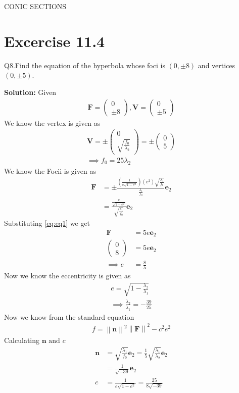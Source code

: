 \documentclass[12pt]{article}
\providecommand{\brak}[1]{\ensuremath{\left(#1\right)}}
\providecommand{\norm}[1]{\left\lVert#1\right\rVert}
\newcommand{\solution}{\noindent \textbf{Solution: }}
\newcommand{\myvec}[1]{\ensuremath{\begin{pmatrix}#1\end{pmatrix}}}
\let\vec\mathbf
\begin{document}
\begin{center}
\textbf\large{CONIC SECTIONS}

\end{center}
\section*{Excercise 11.4}
Q8.Find the equation of the hyperbola whose foci is $\brak{0,\pm 8}$ and vertices $\brak{0,\pm 5}$.

\solution
Given
\begin{align}
	\vec{F} = \myvec{0\\\pm 8}, \vec{V} = \myvec{0\\\pm 5} 
\end{align}
We know the vertex is given as
\begin{align}
	\vec{V} = \pm\myvec{0\\\sqrt{\frac{f_0}{\lambda_2}}} = \pm\myvec{0\\5}\\
	\label{eq:eq1}
	\implies f_0 = 25\lambda_2
\end{align}
We know the Focii is given as
\begin{align}
	\vec{F} &= \pm \frac{\brak{\frac{1}{e\sqrt{1-e^2}}}\brak{e^2}\sqrt{\frac{\lambda_1}{f_0}}}{\frac{\lambda_1}{f_0}}\vec{e}_2\\
	        &= \frac{\frac{e}{\sqrt{1-e^2}}}{\sqrt{\frac{\lambda_1}{f_0}}}\vec{e}_2
\end{align}
Substituting \eqref{eq:eq1} we get
\begin{align}
	\vec{F} &= 5e\vec{e}_2\\
	\myvec{0\\8} &= 5e\vec{e}_2\\
	\implies e &= \frac{8}{5}
\end{align}
Now we know the eccentricity is given as
\begin{align}
	e = \sqrt{1-\frac{\lambda_2}{\lambda_1}}\\
	\label{eq:eq2}
	\implies \frac{\lambda_2}{\lambda_1} = -\frac{39}{25}
\end{align}
Now we know from the standard equation
\begin{align}
	\label{eq:eq3}
	f = \norm{\vec{n}}^2 \norm{\vec{F}}^2 - c^2 e^2
\end{align}
Calculating $\vec{n} \text{ and } c$
\begin{align}
	\vec{n} &= \sqrt{\frac{\lambda_1}{f_0}}\vec{e}_2 = \frac{1}{5}\sqrt{\frac{\lambda_1}{\lambda_2}}\vec{e}_2\\
	        &= \frac{1}{\sqrt{-39}}\vec{e}_2\\
	c &= \frac{1}{e\sqrt{1-e^2}} = \frac{25}{8\sqrt{-39}}	
\end{align}
\end{document}
